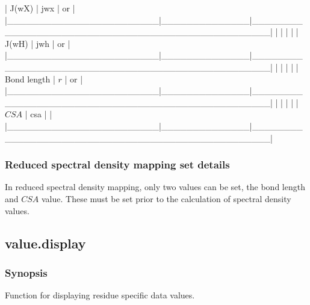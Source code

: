 | J(wX)                  | jwx          | 
 or 
                   |
|\_\_\_\_\_\_\_\_\_\_\_\_\_\_\_\_\_\_\_\_\_\_\_\_|\_\_\_\_\_\_\_\_\_\_\_\_\_\_|\_\_\_\_\_\_\_\_\_\_\_\_\_\_\_\_\_\_\_\_\_\_\_\_\_\_\_\_\_\_\_\_\_\_\_\_\_\_\_\_\_\_\_\_\_\_\_\_\_\_|
|                        |              |                                                  |
| J(wH)                  | jwh          | 
 or 
                   |
|\_\_\_\_\_\_\_\_\_\_\_\_\_\_\_\_\_\_\_\_\_\_\_\_|\_\_\_\_\_\_\_\_\_\_\_\_\_\_|\_\_\_\_\_\_\_\_\_\_\_\_\_\_\_\_\_\_\_\_\_\_\_\_\_\_\_\_\_\_\_\_\_\_\_\_\_\_\_\_\_\_\_\_\_\_\_\_\_\_|
|                        |              |                                                  |
| Bond length            | $r$            | 
 or 
                 |
|\_\_\_\_\_\_\_\_\_\_\_\_\_\_\_\_\_\_\_\_\_\_\_\_|\_\_\_\_\_\_\_\_\_\_\_\_\_\_|\_\_\_\_\_\_\_\_\_\_\_\_\_\_\_\_\_\_\_\_\_\_\_\_\_\_\_\_\_\_\_\_\_\_\_\_\_\_\_\_\_\_\_\_\_\_\_\_\_\_|
|                        |              |                                                  |
| $CSA$                    | csa          | 
                                 |
|\_\_\_\_\_\_\_\_\_\_\_\_\_\_\_\_\_\_\_\_\_\_\_\_|\_\_\_\_\_\_\_\_\_\_\_\_\_\_|\_\_\_\_\_\_\_\_\_\_\_\_\_\_\_\_\_\_\_\_\_\_\_\_\_\_\_\_\_\_\_\_\_\_\_\_\_\_\_\_\_\_\_\_\_\_\_\_\_\_|



\subsubsection{Reduced spectral density mapping set details}

In reduced spectral density mapping, only two values can be set, the bond length and $CSA$
value.  These must be set prior to the calculation of spectral density values.


\newpage

\subsection{value.display}


\subsubsection{Synopsis}

Function for displaying residue specific data values.

